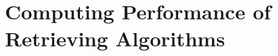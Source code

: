 \documentclass[11pt, oneside]{article}   	%
\begin{document}
\subsection{}
\subsection{}
\subsection{}

\section{Computing Performance of Retrieving Algorithms}
\subsection{}
\subsection{}
\subsection{}
\subsection{}
\subsection{}
\end{document}

